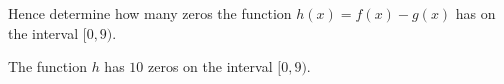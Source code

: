 Hence determine how many zeros the function $h(x)=f(x)-g(x)$
has on the interval $[0,9)$.\label{line:interval1}
\begin{shortsolution}
The function $h$ has $10$ zeros on the 
            interval $[0,9)$.\label{line:interval2}
\end{shortsolution}
